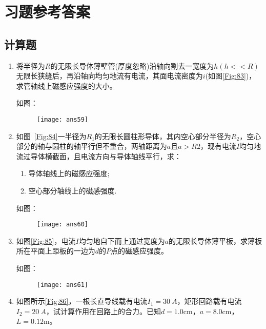 \section{习题参考答案}
\subsection*{计算题}
\begin{enumerate}
    \item 将半径为$R$的无限长导体薄壁管(厚度忽略)沿轴向割去一宽度为$h(h<<R)$无限长狭缝后，再沿轴向均匀地流有电流，其面电流密度为$i$(如图\ref{Fig:83})，求管轴线上磁感应强度的大小。
    \begin{solution}
        如图：
        \begin{figure}[H]
            \centering
            \texttt{[image: ans59]}
        \end{figure}
    \end{solution}
    \item 如图~\ref{Fig:84}一半径为$R_1$的无限长圆柱形导体，其内空心部分半径为$R_2$，空心部分的轴与圆柱的轴平行但不重合，两轴距离为$a$且$a>R2$，现有电流$I$均匀地流过导体横截面，且电流方向与导体轴线平行，求：
    \begin{enumerate}[label=\arabic*]
        \item 导体轴线上的磁感应强度;
        \item 空心部分轴线上的磁感强度.
    \end{enumerate}
    \begin{solution}
        如图：
        \begin{figure}[H]
            \centering
            \texttt{[image: ans60]}
        \end{figure}
    \end{solution}
    \item 如图\ref{Fig:85}，电流$I$均匀地自下而上通过宽度为$a$的无限长导体薄平板，求薄板所在平面上距板的一边为$d$的$P$点的磁感应强度。
    \begin{solution}
        如图：
        \begin{figure}[H]
            \centering
            \texttt{[image: ans61]}
        \end{figure}
    \end{solution}
    \item 如图所示\ref{Fig:86}，一根长直导线载有电流$I_1=30~A$，矩形回路载有电流$I_2=20~A$，试计算作用在回路上的合力。已知$d=1.0$cm，$a=8.0$cm，$L=0.12$m。

\end{enumerate}

